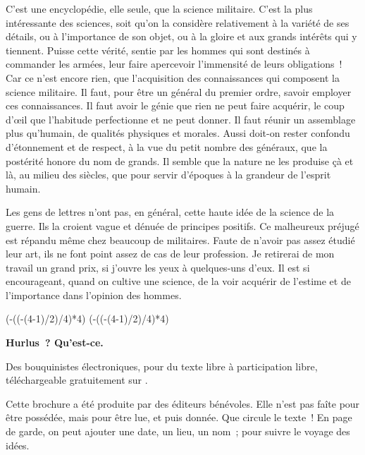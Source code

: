 \documentclass[french,twoside]{book} %
\def\truncdiv#1#2{((#1-(#2-1)/2)/#2)}
\def\moduloop#1#2{(#1-\truncdiv{#1}{#2}*#2)}
\def\modulo#1#2{\number\numexpr\moduloop{#1}{#2}\relax}
\begin{document}
C’est une encyclopédie, elle seule, que la science militaire. C’est la plus intéressante des sciences, soit qu’on la considère relativement à la variété de ses détails, ou à l’importance de son objet, ou à la gloire et aux grands intérêts qui y tiennent. Puisse cette vérité, sentie par les hommes qui sont destinés à commander les armées, leur faire apercevoir l’immensité de leurs obligations ! Car ce n’est encore rien, que l’acquisition des connaissances qui composent la science militaire. Il faut, pour être un général du premier ordre, savoir employer ces connaissances. Il faut avoir le génie que rien ne peut faire acquérir, le coup d’œil que l’habitude perfectionne et ne peut donner. Il faut réunir un assemblage plus qu’humain, de qualités physiques et morales. Aussi doit-on rester confondu d’étonnement et de respect, à la vue du petit nombre des généraux, que la postérité honore du nom de grands. Il semble que la nature ne les produise çà et là, au milieu des siècles, que pour servir d’époques à la grandeur de l’esprit humain.\par
Les gens de lettres n’ont pas, en général, cette haute idée de la science de la guerre. Ils la croient vague et dénuée de principes positifs. Ce malheureux préjugé est répandu même chez beaucoup de militaires. Faute de n’avoir pas assez étudié leur art, ils ne font point assez de cas de leur profession. Je retirerai de mon travail un grand prix, si j’ouvre les yeux à quelques-uns d’eux. Il est si encourageant, quand on cultive une science, de la voir acquérir de l’estime et de l’importance dans l’opinion des hommes.
 


\ifbooklet
  \pagestyle{empty}
  \clearpage
  \ifnum\modulo{\value{page}}{4}=0 \hbox{}\newpage\hbox{}\newpage\fi
  \ifnum\modulo{\value{page}}{4}=1 \hbox{}\newpage\hbox{}\newpage\fi


  \hbox{}\newpage
  \ifodd\value{page}\hbox{}\newpage\fi
  {\centering\color{rubric}\bfseries\noindent\large
    Hurlus ? Qu’est-ce.\par
    \bigskip
  }
  \noindent Des bouquinistes électroniques, pour du texte libre à participation libre,
  téléchargeable gratuitement sur \href{https://hurlus.fr}{}.\par
  \bigskip
  \noindent Cette brochure a été produite par des éditeurs bénévoles.
  Elle n’est pas faîte pour être possédée, mais pour être lue, et puis donnée.
  Que circule le texte !
  En page de garde, on peut ajouter une date, un lieu, un nom ; pour suivre le voyage des idées.
  \par
\end{document}
